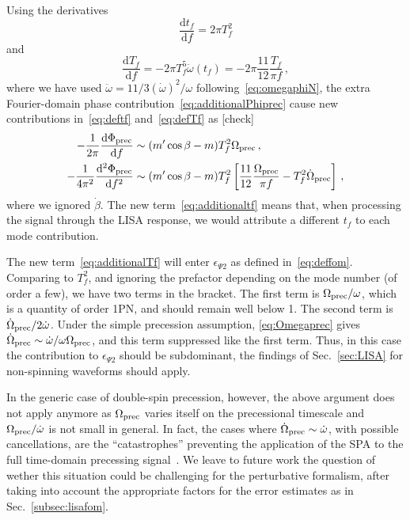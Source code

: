 \documentclass[aps,showpacs,twocolumn,
prd,superscriptaddress,nofootinbib]{revtex4-1}
\newcommand{\be}{\begin{equation}}
\newcommand{\ee}{\end{equation}}
\newcommand\ud{{\mathrm{d}}}
\newcommand{\tf}{t_{f}}
\newcommand{\Tf}{T_{f}}
\newcommand{\SM}[1]{{\color{Red} #1}}
\begin{document}
Using the derivatives
\be
	\frac{\ud \tf}{\ud f} = 2\pi \Tf^{2}
\ee
and
\be
	\frac{\ud \Tf}{\ud f} = -2\pi \Tf^{5} \ddot{\omega}(\tf) = - 2\pi \frac{11}{12} \frac{\Tf}{\pi f} \,,
\ee
where we have used $\ddot{\omega} = 11/3 (\dot{\omega})^{2}/\omega$ following~\eqref{eq:omegaphiN}, the extra Fourier-domain phase contribution~\eqref{eq:additionalPhiprec} cause new contributions in~\eqref{eq:deftf} and~\eqref{eq:defTf} as \SM{[check]}
\begin{subequations}
\begin{align}
	-\frac{1}{2\pi} \frac{\ud \Phi_{\rm prec}}{\ud f} &\sim (m' \cos \beta - m) \Tf^{2} \Omega_{\rm prec} \,, \label{eq:additionaltf}\\
	-\frac{1}{4\pi^{2}} \frac{\ud^{2} \Phi_{\rm prec}}{\ud f^{2}} &\sim (m' \cos \beta - m) \Tf^{2} \left[ \frac{11}{12} \frac{\Omega_{\rm prec}}{\pi f} - \Tf^{2} \dot{\Omega}_{\rm prec} \right] \,, \label{eq:additionalTf}
\end{align}
\end{subequations}
where we ignored $\dot{\beta}$. The new term~\eqref{eq:additionaltf} means that, when processing the signal through the LISA response, we would attribute a different $\tf$ to each mode contribution.

The new term~\eqref{eq:additionalTf} will enter $\epsilon_{\Psi 2}$ as defined in~\eqref{eq:deffom}. Comparing to $\Tf^{2}$, and ignoring the prefactor depending on the mode number (of order a few), we have two terms in the bracket. The first term is $\Omega_{\rm prec} / \omega$, which is a quantity of order 1PN, and should remain well below 1. The second term is $\dot{\Omega}_{\rm prec} / 2\dot{\omega}$. Under the simple precession assumption, \eqref{eq:Omegaprec} gives $\dot{\Omega}_{\rm prec} \sim \dot{\omega}/\omega \Omega_{\rm prec}$, and this term suppressed like the first term. Thus, in this case the contribution to $\epsilon_{\Psi 2}$ should be subdominant, the findings of Sec.~\ref{sec:LISA} for non-spinning waveforms should apply.   

In the generic case of double-spin precession, however, the above argument does not apply anymore as $\Omega_{\rm prec}$ varies itself on the precessional timescale and $\Omega_{\rm prec} / \dot{\omega}$ is not small in general. In fact, the cases where $\dot{\Omega}_{\rm prec} \sim \dot{\omega}$, with possible cancellations, are the ``catastrophes'' preventing the application of the SPA to the full time-domain precessing signal~\cite{KCY13}. We leave to future work the question of wether this situation could be challenging for the perturbative formalism, after taking into account the appropriate factors for the error estimates as in Sec.~\ref{subsec:lisafom}.
\end{document}
